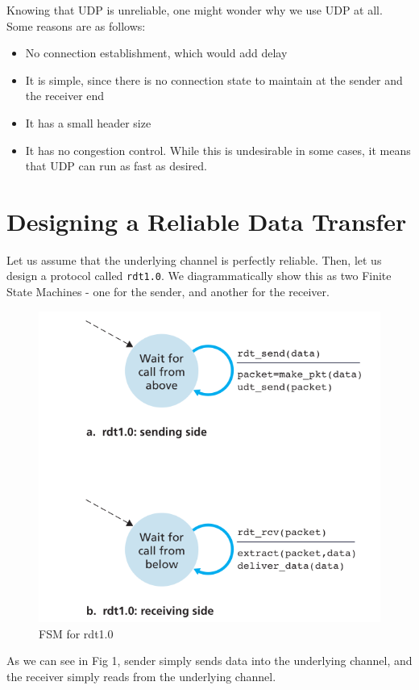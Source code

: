 \documentclass[12pt,letterpaper]{book}
\theoremstyle{definition}
\begin{document}
Knowing that UDP is unreliable, one might wonder why we use UDP at all. Some reasons are as follows:
\begin{itemize}
  \item No connection establishment, which would add delay
  \item It is simple, since there is no connection state to maintain at the sender and the receiver end
  \item It has a small header size
  \item It has no congestion control. While this is undesirable in some cases, it means that UDP can run as fast as desired.
\end{itemize}

\section{Designing a Reliable Data Transfer}

Let us assume that the underlying channel is perfectly reliable. Then, let us design a protocol called \texttt{rdt1.0}. We diagrammatically show this as two Finite State Machines - one for the sender, and another for the receiver.

\begin{figure}[htpb]
  \centering
  \includegraphics[width=0.8\linewidth]{./assets/rdt1_fsm.png}
  \caption{FSM for rdt1.0}%
  \label{fig:}
\end{figure}

As we can see in Fig 1, sender simply sends data into the underlying channel, and the receiver simply reads from the underlying channel.
\end{document}
